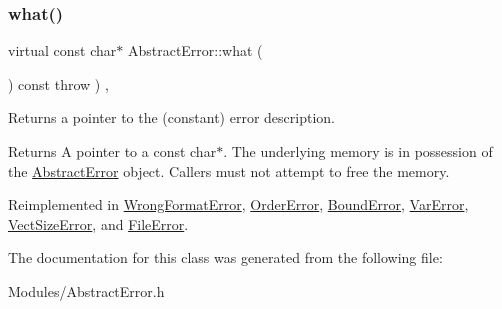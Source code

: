 \subsubsection{\texorpdfstring{what()}{what()}}
{\footnotesize\ttfamily virtual const char$\ast$ Abstract\+Error\+::what (\begin{DoxyParamCaption}{ }\end{DoxyParamCaption}) const throw  ) \hspace{0.3cm}{\ttfamily [inline]}, {\ttfamily [virtual]}}

Returns a pointer to the (constant) error description. \begin{DoxyReturn}{Returns}
A pointer to a const char$\ast$. The underlying memory is in possession of the \hyperlink{classAbstractError}{Abstract\+Error} object. Callers must not attempt to free the memory. 
\end{DoxyReturn}


Reimplemented in \hyperlink{structWrongFormatError_a3c1c3f39ce135d19c7d0bb2fe8ddd3c1}{Wrong\+Format\+Error}, \hyperlink{structOrderError_a55140961b8a995ff9111a275cac708c8}{Order\+Error}, \hyperlink{structBoundError_a58ec01d9e329a9604cda74a8c273879a}{Bound\+Error}, \hyperlink{structVarError_a48ee904c5e61633cb6f4b9af2d093eaa}{Var\+Error}, \hyperlink{structVectSizeError_af92248320a9fb06b025662736a742c9e}{Vect\+Size\+Error}, and \hyperlink{structFileError_a7446417295daef00459e8d7e16cbb151}{File\+Error}.



The documentation for this class was generated from the following file\+:\begin{DoxyCompactItemize}
\item 
Modules/Abstract\+Error.\+h\end{DoxyCompactItemize}
